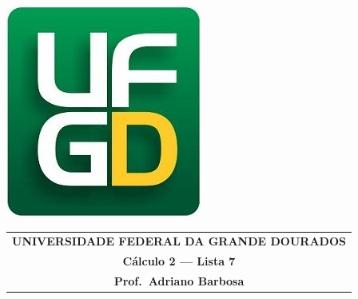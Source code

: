 \documentclass[a4paper,5pt]{amsbook}
\begin{document}
\thispagestyle{empty}
\pagestyle{empty}
\begin{minipage}[h]{0.14\textwidth}
	\includegraphics[scale=0.24]{../../ufgd.png}
\end{minipage}
\begin{minipage}[h]{\textwidth}
\begin{tabular}{c}
{{\bf UNIVERSIDADE FEDERAL DA GRANDE DOURADOS}}\\
{{\bf C\'{a}lculo 2 --- Lista 7}}\\
{{\bf Prof.\ Adriano Barbosa}}\\
\end{tabular}
\vspace{-0.45cm}
%
\end{minipage}

\end{document}

